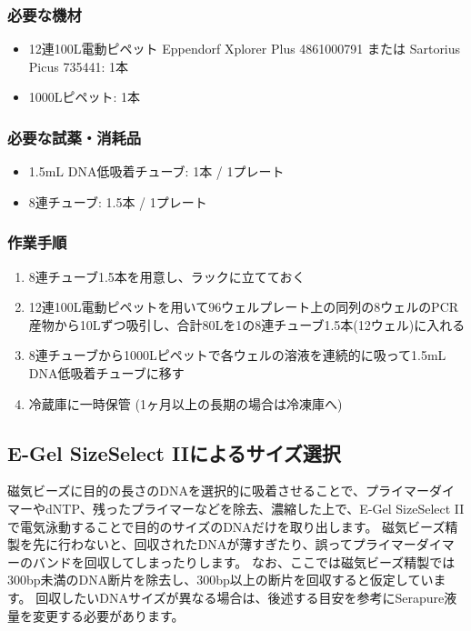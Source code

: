 \documentclass[titlepage,10pt,a4paper,uplatex]{jsbook}
\begin{document}
\subsubsection{必要な機材}
\begin{itemize}
\item 12連100{\textmu}L電動ピペット Eppendorf Xplorer Plus 4861000791 または Sartorius Picus 735441: 1本
\item 1000{\textmu}Lピペット: 1本
\end{itemize}

\subsubsection{必要な試薬・消耗品}
\begin{itemize}
\item 1.5mL DNA低吸着チューブ: 1本 / 1プレート
\item 8連チューブ: 1.5本 / 1プレート
\end{itemize}

\subsubsection{作業手順}
\begin{enumerate}
\item 8連チューブ1.5本を用意し、ラックに立てておく
\item 12連100{\textmu}L電動ピペットを用いて96ウェルプレート上の同列の8ウェルのPCR産物から10{\textmu}Lずつ吸引し、合計80{\textmu}Lを1の8連チューブ1.5本(12ウェル)に入れる
\item 8連チューブから1000{\textmu}Lピペットで各ウェルの溶液を連続的に吸って1.5mL DNA低吸着チューブに移す
\item 冷蔵庫に一時保管 (1ヶ月以上の長期の場合は冷凍庫へ)
\end{enumerate}

\subsection{E-Gel SizeSelect IIによるサイズ選択}

磁気ビーズに目的の長さのDNAを選択的に吸着させることで、プライマーダイマーやdNTP、残ったプライマーなどを除去、濃縮した上で、E-Gel SizeSelect IIで電気泳動することで目的のサイズのDNAだけを取り出します。
磁気ビーズ精製を先に行わないと、回収されたDNAが薄すぎたり、誤ってプライマーダイマーのバンドを回収してしまったりします。
なお、ここでは磁気ビーズ精製では300bp未満のDNA断片を除去し、300bp以上の断片を回収すると仮定しています。
回収したいDNAサイズが異なる場合は、後述する目安を参考にSerapure液量を変更する必要があります。
\end{document}
